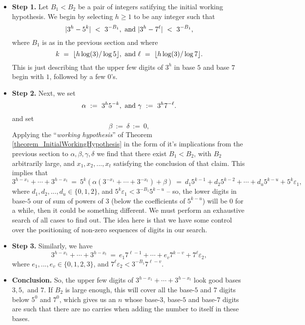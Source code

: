 \documentclass[12pt]{article}
\begin{document}
\begin{itemize} 

\item \textbf{Step 1.} 
Let $B_1 < B_2$ be a pair of integers satifying the initial working hypothesis. 
We begin by selecting $h \geq 1$ to be any integer such that 
$$
|3^h - 5^k|\ <\ 3^{-B_1},\ {\rm and\ } 
|3^h - 7^\ell|\ <\ 3^{-B_1},
$$
where $B_1$ is as in the previous section and where
$$
k\ =\ \lfloor h \log(3) / \log 5 \rfloor,\ {\rm and\ } \ell\ =\ 
\lfloor h \log(3) / \log 7 \rfloor.
$$
This is just describing that the upper few digits of $3^h$ in base $5$ and base
$7$ begin with $1$, followed by a few $0$'s.  

\item \textbf{Step 2.} 
Next, we set 
$$
\alpha\ :=\ 3^h 5^{-k},\ {\rm and\ }\gamma\ :=\ 3^h 7^{-\ell}.
$$
and set
$$
\beta\ :=\ \delta\ :=\ 0,
$$ 
Applying the ``\emph{working hypothesis}'' of Theorem \ref{theorem_InitialWorkingHypothesis} in the 
form of it's implications from the previous section to 
$\alpha,\beta, \gamma, \delta$ we find that there exist $B_1 < B_2$,
with $B_2$ arbitrarily large, 
and $x_1, x_2, ..., x_t$ satisfying the conclusion of that claim.  
This implies that
$$
3^{h-x_1} + \cdots + 3^{h-x_t}\ =\ 5^k ( \alpha (3^{-x_1} + \cdots + 
3^{-x_t}) + \beta)\ =\ d_1 5^{k-1} + d_2 5^{k-2} + \cdots + d_u 5^{k-u}
+ 5^k \varepsilon_1,   
$$
where $d_1,d_2,...,d_u \in \{0,1,2\}$, and 
$5^k \varepsilon_1 < 3^{-B_1} 5^{k-u}$ -- so, the lower digits in base-$5$
our of sum of powers of $3$ (below the coefficients of $5^{k-u}$) 
will be $0$ for a while, then it could be something
different. We must perform an exhaustive search of all cases to find out.  
The idea here is that we have some control over the positioning of non-zero sequences of digits in our search. 

\item \textbf{Step 3.} 
Similarly, we have
$$
3^{h-x_1} + \cdots + 3^{h-x_t}\ =\ e_1 7^{\ell-1} + \cdots + e_v 7^{k-v}
+ 7^\ell \varepsilon_2,
$$
where $e_1,...,e_v \in \{0,1,2,3\}$, and $7^\ell \varepsilon_2 < 
3^{-B_1} 7^{\ell-v}$.

\item \textbf{Conclusion.} 
So, the upper few digits of $3^{h-x_1} + \cdots + 3^{h-x_t}$ look good
bases $3,5,$ and $7$.  If $B_2$ is large enough, this will cover all 
the base-$5$ and $7$ digits below $5^0$ and $7^0$, which gives us an $n$
whose base-$3$, base-$5$ and base-$7$ digits are such that there are no
carries when adding the number to itself in these bases. 
\end{itemize} 
\end{document}
